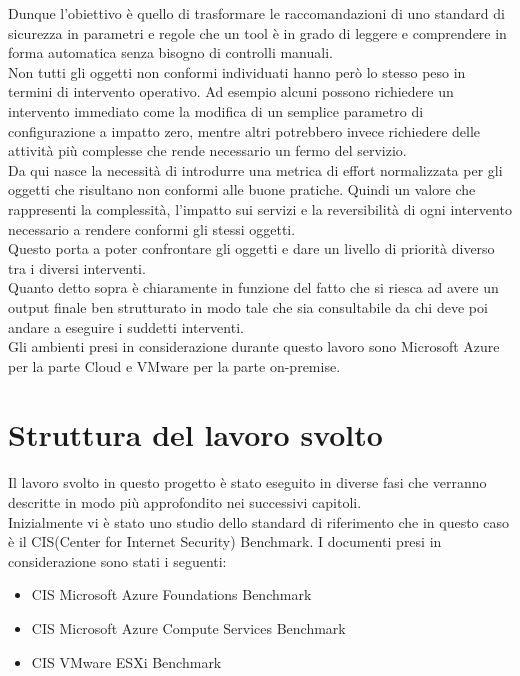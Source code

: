 \documentclass[a4paper,11pt]{report}
\begin{document}
Dunque l'obiettivo è quello di trasformare le raccomandazioni di uno standard di sicurezza in parametri e regole che un tool è in grado di leggere e comprendere in forma automatica senza bisogno di controlli manuali. \\
Non tutti gli oggetti non conformi individuati hanno però lo stesso peso in termini di intervento operativo. Ad esempio alcuni possono richiedere un intervento immediato come la modifica di un semplice parametro di configurazione a impatto zero, mentre altri potrebbero invece richiedere delle attività più complesse che rende necessario un fermo del servizio. \\
Da qui nasce la necessità di introdurre una metrica di effort normalizzata per gli oggetti che risultano non conformi alle buone pratiche. Quindi un valore che rappresenti la complessità, l'impatto sui servizi e la reversibilità di ogni intervento necessario a rendere conformi gli stessi oggetti. \\
Questo porta a poter confrontare gli oggetti e dare un livello di priorità diverso tra i diversi interventi.\\
Quanto detto sopra è chiaramente in funzione del fatto che si riesca ad avere un output finale ben strutturato in modo tale che sia consultabile da chi deve poi andare a eseguire i suddetti interventi. \\

Gli ambienti presi in considerazione durante questo lavoro sono Microsoft Azure per la parte Cloud e VMware per la parte on-premise.

\section{Struttura del lavoro svolto}

Il lavoro svolto in questo progetto è stato eseguito in diverse fasi che verranno descritte in modo più approfondito nei successivi capitoli.\\

Inizialmente vi è stato uno studio dello standard di riferimento che in questo caso è il CIS(Center for Internet Security) Benchmark. I documenti presi in considerazione sono stati i seguenti:
\begin{itemize}
\item CIS Microsoft Azure Foundations Benchmark \cite{CIS_Azure_1}
\item CIS Microsoft Azure Compute Services Benchmark \cite{CIS_Azure_2}
\item CIS VMware ESXi Benchmark \cite{CIS_VMware} \\
\end{itemize}
\end{document}
